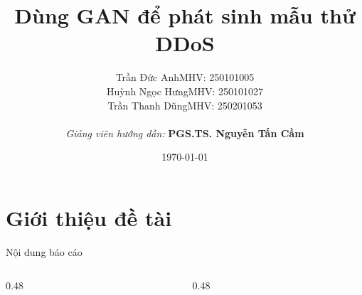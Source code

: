 \documentclass[aspectratio=169,11pt]{beamer}
\title[DDoS-GAN: Basic vs Adversarial]
      {\textbf{Dùng GAN để phát sinh mẫu thử DDoS}}
\author[Nhóm 3 SV]{%
  \small
  \begin{tabular}{ll}
    Trần Đức Anh & \textnormal{MHV: 250101005} \\
    Huỳnh Ngọc Hưng & \textnormal{MHV: 250101027} \\
    Trần Thanh Dũng & \textnormal{MHV: 250201053} \\
  \end{tabular}\\[4pt]
  \textit{Giảng viên hướng dẫn:} \textbf{PGS.TS. Nguyễn Tấn Cầm}
}
\date{\today}
\begin{document}
\section{Giới thiệu đề tài}

\begin{frame}[plain]
  \titlepage
\end{frame}

\begin{frame}{Nội dung báo cáo}
  \begin{columns}[T]
    \begin{column}{0.48\textwidth}
      \tableofcontents[sections={1-3}]
    \end{column}
    \begin{column}{0.48\textwidth}
      \tableofcontents[sections={4-6}]
    \end{column}
  \end{columns}
\end{frame}
\end{document}
